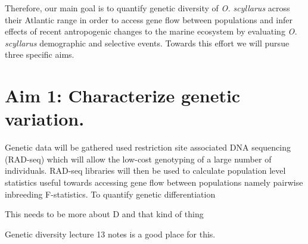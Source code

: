 \documentclass[11pt]{article}
\begin{document}
Therefore, our main goal is to quantify genetic diversity of \emph{O. scyllarus} across their Atlantic range in order to access gene flow between populations and infer effects of recent antropogenic changes to the marine ecosystem by evaluating \emph{O. scyllarus} demographic and selective events. Towards this effort we will pursue three specific aims.

\section*{Aim 1: Characterize genetic variation.}

Genetic data will be gathered used restriction site associated DNA sequencing (RAD-seq) \cite{rad2011} which will allow the low-cost genotyping of a large number of individuals. RAD-seq libraries will then be used to calculate population level statistics useful towards accessing gene flow between populations namely pairwise inbreeding F-statistics. To quantify genetic differentiation   

This needs to be more about D and that kind of thing 

Genetic diversity lecture 13 notes is a good place for this.
\end{document}
